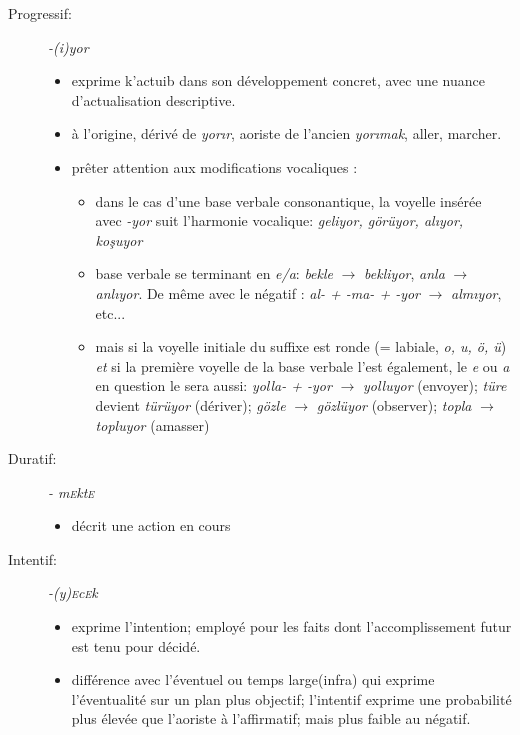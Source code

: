 \documentclass{cours}
\newcommand{\ch}{\c{s}}
\newcommand{\sce}{\textsc{e}}
\begin{document}
\begin{description}
    \item[Progressif:] {\it -(i)yor}
        \begin{itemize}
            \item exprime k'actuib dans son développement concret, avec une nuance d'actualisation descriptive.
            \item à l'origine, dérivé de \textit{yor\i r}, aoriste de l'ancien \textit{yor\i mak}, \og aller, marcher\fg.
            \item prêter attention aux modifications vocaliques :
                  \begin{itemize}[label = \textbullet]
                      \item dans le cas d'une base verbale consonantique, la voyelle insérée avec \textit{-yor} suit l'harmonie vocalique: \textit{geliyor, görüyor, al\i yor, ko\ch uyor}
                      \item base verbale se terminant en \textit{e/a}: \textit{bekle} $\to$ \textit{bekliyor}, \textit{anla} $\to$ \textit{anl\i yor}. De même avec le négatif : \textit{al- + -ma- + -yor} $\to$ \textit{alm\i yor}, etc...
                      \item mais si la voyelle initiale du suffixe est \og ronde \fg (= labiale, \textit{o, u, ö, ü}) \emph{et} si la première voyelle de la base verbale l'est également, le \textit{e} ou {\it a} en question le sera aussi: \textit{yolla- + -yor} $\to$ \textit{yolluyor} (envoyer); \textit{türe} devient \textit{türüyor} (dériver); \textit{gözle} $\to$ \textit{gözlüyor} (observer); \textit{topla} $\to$ \textit{topluyor} (amasser)
                  \end{itemize}
        \end{itemize}
    \item [Duratif:] {\it - m\sce kt\sce}
          \begin{itemize}
              \item décrit une action en cours
          \end{itemize}
    \item [Intentif:] {\it -(y)\sce c\sce k}
          \begin{itemize}
              \item exprime l'intention; employé pour les faits dont l'accomplissement futur est tenu pour décidé.
              \item différence avec l'éventuel ou \og temps large\fg (infra) qui exprime l'éventualité sur un plan plus objectif; l'intentif exprime une probabilité plus élevée que l'aoriste à l'affirmatif; mais plus faible au négatif.

\end{itemize}
\end{description}
\end{document}
